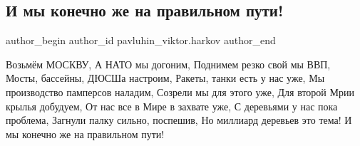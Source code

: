  
 
 
 
 
 
\subsection{И мы конечно же на правильном пути!}
\label{sec:02_12_2021.fb.pavluhin_viktor.harkov.1.pravilnyj_putj}
 
\ifcmt
 author_begin
   author_id pavluhin_viktor.harkov
 author_end
\fi


\obeycr
Возьмём МОСКВУ,
А НАТО мы догоним,
Поднимем резко свой мы ВВП,
Мосты, бассейны, ДЮСШа настроим,
Ракеты, танки есть у нас уже,
Мы производство памперсов наладим,
Созрели мы для этого уже,
Для второй Мрии крылья добудуем,
От нас все в Мире в захвате уже,
С деревьями у нас пока проблема,
Загнули палку сильно, поспешив,
Но миллиард деревьев это тема!
И мы конечно же на правильном пути!
\restorecr

